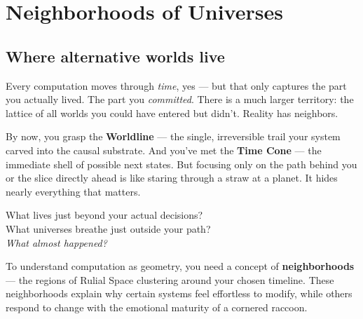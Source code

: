 
\makeatletter
{}
\makeatother

\chapter{Neighborhoods of Universes}
\label{chapter-7-neighborhoods-of-universes}

\section{Where alternative worlds live}

Every computation moves through \emph{time}, yes --- but that only captures the part you actually lived. The part you \emph{committed}. There is a much larger territory: the lattice of all worlds you could have entered but didn't. Reality has neighbors.

By now, you grasp the \textbf{Worldline} --- the single, irreversible trail your system carved into the causal substrate. And you've met the \textbf{Time Cone} --- the immediate shell of possible next states. But focusing only on the path behind you or the slice directly ahead is like staring through a straw at a planet. It hides nearly everything that matters.

What lives just beyond your actual decisions?\\
What universes breathe just outside your path?\\
\textit{What almost happened?}

To understand computation as geometry, you need a concept of \textbf{neighborhoods} --- the regions of Rulial Space clustering around your chosen timeline. These neighborhoods explain why certain systems feel effortless to modify, while others respond to change with the emotional maturity of a cornered raccoon.

